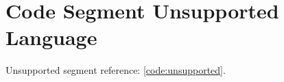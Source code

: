 \documentclass[a4paper,12pt]{report}
\begin{document}
\chapter{Code Segment Unsupported Language}
Unsupported segment reference: \ref{code:unsupported}.
\end{document}
